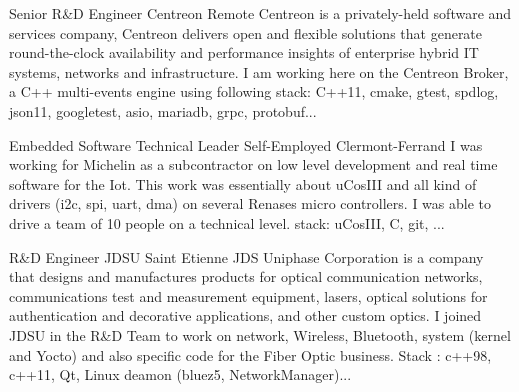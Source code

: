 \documentclass[11pt,a4paper,sans]{moderncv}
\begin{document}
{Senior R\&D Engineer}
{Centreon}
{Remote}
{}
{Centreon is a privately-held software and services company, Centreon
delivers open and flexible solutions that generate round-the-clock availability and performance insights of enterprise hybrid IT systems, networks and infrastructure.
I am working here on the Centreon Broker, a C++ multi-events engine using following\newline{}
stack: C++11, cmake, gtest, spdlog, json11, googletest, asio, mariadb, grpc, protobuf...}

{Embedded Software Technical Leader}
{Self-Employed}
{Clermont-Ferrand}
{}
{I was working for Michelin as a subcontractor on low level development
and real time software for the Iot. This work was essentially about uCosIII
and all kind of drivers (i2c, spi, uart, dma) on several Renases micro
controllers. I was able to drive a team of 10 people on a technical level.}
stack: uCosIII, C, git, ...

{R\&D Engineer}
{JDSU}
{Saint Etienne}
{}
{JDS Uniphase Corporation is a company that designs and manufactures products
for optical communication networks, communications test and measurement
equipment, lasers, optical solutions for authentication and decorative
applications, and other custom optics.
I joined JDSU in the R\&D Team to work on network, Wireless, Bluetooth,
system (kernel and Yocto) and also specific code for the Fiber Optic
business.}
Stack : c++98, c++11, Qt, Linux deamon (bluez5, NetworkManager)...
\end{document}
